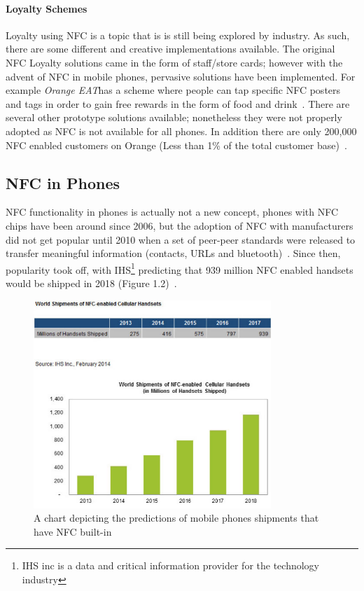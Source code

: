 \paragraph{Loyalty Schemes}
Loyalty using NFC is a topic that is is still being explored by industry. As such, there are some different and creative implementations available. The original NFC Loyalty solutions came in the form of staff/store cards; however with the advent of NFC in mobile phones, pervasive solutions have been implemented. For example \emph{Orange EAT}has a scheme where people can tap specific NFC posters and tags in order to gain free rewards in the form of food and drink~\cite{orange}. There are several other prototype solutions available; nonetheless they were not properly adopted as NFC is not available for all phones. In addition there are only 200,000 NFC enabled customers on Orange (Less than 1\% of the total customer base)~\cite{orange}.
\clearpage{}
\subsection{NFC in Phones}
NFC functionality in phones is actually not a new concept, phones with NFC chips have been around since 2006, but the adoption of NFC with manufacturers did not get popular until 2010 when a set of peer-peer standards were released to transfer meaningful information (contacts, URLs and bluetooth)~\cite{nfcp2pstandards}. Since then, popularity took off, with IHS\footnote{IHS inc is a data and critical information provider for the technology industry} predicting that 939 million NFC enabled handsets would be shipped in 2018 (Figure 1.2)~\cite{IHSchart}.
\begin{figure}[H]
  \centering
    \includegraphics[width=0.8\textwidth]{img/smartphoneNFC.png}
      \caption{A chart depicting the predictions of mobile phones shipments that have NFC built-in}
\end{figure}

